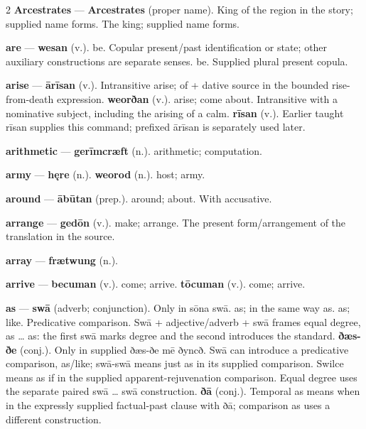\begin{multicols}{2}
\textbf{Arcestrates} — \textbf{Arcestrates} (proper name). King of the region in the story; supplied name forms. The king; supplied name forms.\par
\textbf{are} — \textbf{wesan} (v.). be. Copular present/past identification or state; other auxiliary constructions are separate senses. be. Supplied plural present copula.\par
\textbf{arise} — \textbf{ārīsan} (v.). Intransitive arise; of + dative source in the bounded rise-from-death expression. \textbf{weorðan} (v.). arise; come about. Intransitive with a nominative subject, including the arising of a calm. \textbf{rīsan} (v.). Earlier taught rīsan supplies this command; prefixed ārīsan is separately used later.\par
\textbf{arithmetic} — \textbf{gerīmcræft} (n.). arithmetic; computation.\par
\textbf{army} — \textbf{hęre} (n.).  \textbf{weorod} (n.). host; army.\par
\textbf{around} — \textbf{ābūtan} (prep.). around; about. With accusative.\par
\textbf{arrange} — \textbf{gedōn} (v.). make; arrange. The present form/arrangement of the translation in the source.\par
\textbf{array} — \textbf{frætwung} (n.).\par
\textbf{arrive} — \textbf{becuman} (v.). come; arrive. \textbf{tōcuman} (v.). come; arrive.\par
\textbf{as} — \textbf{swā} (adverb; conjunction). Only in sōna swā. as; in the same way as. as; like. Predicative comparison. Swā + adjective/adverb + swā frames equal degree, as … as: the first swā marks degree and the second introduces the standard. \textbf{ðæs-ðe} (conj.). Only in supplied ðæs-ðe mē ðyncð. Swā can introduce a predicative comparison, as/like; swā-swā means just as in its supplied comparison. Swilce means as if in the supplied apparent-rejuvenation comparison. Equal degree uses the separate paired swā … swā construction. \textbf{ðā} (conj.). Temporal as means when in the expressly supplied factual-past clause with ðā; comparison as uses a different construction.\par

\end{multicols}
